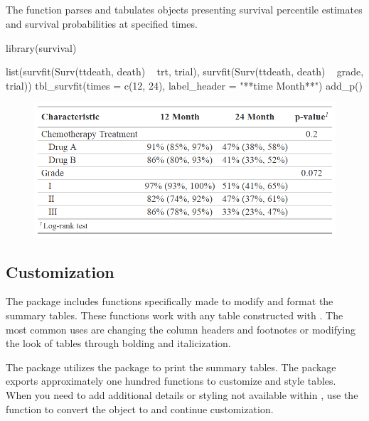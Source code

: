 \subsection{\texorpdfstring{}{tbl\_survfit()}}

The  function parses and tabulates  objects presenting survival percentile estimates and survival probabilities at specified times.

\begin{example}
library(survival)

list(survfit(Surv(ttdeath, death) ~ trt, trial),
     survfit(Surv(ttdeath, death) ~ grade, trial)) %
  tbl_survfit(times = c(12, 24),
              label_header = "**{time} Month**") %
  add_p()
\end{example}

\begin{figure}[h!]
  \includegraphics[scale=0.73]{survfit.png}
  \centering
\end{figure}

\subsection{Customization}

The  package includes functions specifically made to modify and format the summary tables.
These functions work with any table constructed with .
The most common uses are changing the column headers and footnotes or modifying the look of tables through bolding and italicization.

\newpage


The  package utilizes the  package to print the summary tables.
The  package exports approximately one hundred functions to customize and style tables.
When you need to add additional details or styling not available within , use the  function to convert the  object to  and continue customization.

